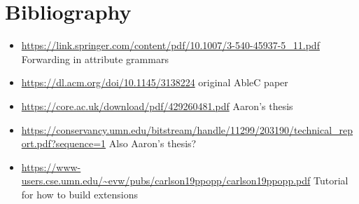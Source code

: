\documentclass[main.tex]{subfiles}
\begin{document}
    \section*{Bibliography}
	\begin{itemize}
	\item \url{https://link.springer.com/content/pdf/10.1007/3-540-45937-5_11.pdf} Forwarding in attribute grammars
	\item \url{https://dl.acm.org/doi/10.1145/3138224} original AbleC paper
	\item \url{https://core.ac.uk/download/pdf/429260481.pdf} Aaron's thesis
	\item \url{https://conservancy.umn.edu/bitstream/handle/11299/203190/technical_report.pdf?sequence=1} Also Aaron's thesis?
	\item \url{https://www-users.cse.umn.edu/~evw/pubs/carlson19ppopp/carlson19ppopp.pdf} Tutorial for how to build extensions
	\end{itemize}
\end{document}
